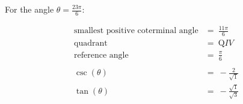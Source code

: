For the angle $\theta = \frac{23\pi}{6}$:

$$
\begin{align*}
  \text{smallest positive coterminal angle} &=\ \frac{11\pi}{6} \\
  \text{quadrant} &=\ \text{Q}IV \\
  \text{reference angle} &=\ \frac{\pi}{6} \\
  \\
  \csc(\theta) &=\ -\frac{2}{\sqrt{1}} \\
  \tan(\theta) &=\ -\frac{\sqrt{1}}{\sqrt{3}}
\end{align*}
$$

